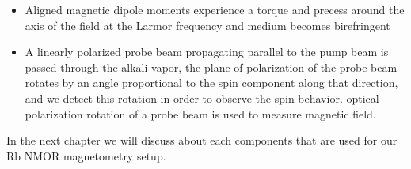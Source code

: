 \begin{itemize}
\item Aligned magnetic dipole moments experience a torque and precess around the axis of the field at the Larmor frequency and medium becomes birefringent
\end{itemize}
\begin{itemize}
\item A linearly polarized probe beam propagating parallel to the
pump beam is passed through the alkali vapor, the plane of polarization of the probe beam
rotates by an angle proportional to the spin component along that direction, and we detect
this rotation in order to observe the spin behavior. optical polarization rotation of a probe beam is used to measure magnetic field.
\end{itemize}

In the next chapter we will discuss about each components that are used for our Rb NMOR magnetometry setup.

